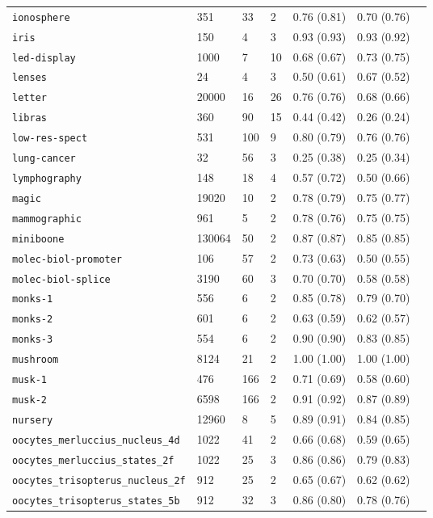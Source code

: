 \begin{tabular}{lllllll}
\verb!ionosphere! & 351 & 33 & 2 & 0.76 (0.81) & 0.70 (0.76)\\ 
\verb!iris! & 150 & 4 & 3 & 0.93 (0.93) & 0.93 (0.92)\\ 
\verb!led-display! & 1000 & 7 & 10 & 0.68 (0.67) & 0.73 (0.75)\\ 
\verb!lenses! & 24 & 4 & 3 & 0.50 (0.61) & 0.67 (0.52)\\ 
\verb!letter! & 20000 & 16 & 26 & 0.76 (0.76) & 0.68 (0.66)\\ 
\verb!libras! & 360 & 90 & 15 & 0.44 (0.42) & 0.26 (0.24)\\ 
\verb!low-res-spect! & 531 & 100 & 9 & 0.80 (0.79) & 0.76 (0.76)\\ 
\verb!lung-cancer! & 32 & 56 & 3 & 0.25 (0.38) & 0.25 (0.34)\\ 
\verb!lymphography! & 148 & 18 & 4 & 0.57 (0.72) & 0.50 (0.66)\\ 
\verb!magic! & 19020 & 10 & 2 & 0.78 (0.79) & 0.75 (0.77)\\ 
\verb!mammographic! & 961 & 5 & 2 & 0.78 (0.76) & 0.75 (0.75)\\ 
\verb!miniboone! & 130064 & 50 & 2 & 0.87 (0.87) & 0.85 (0.85)\\ 
\verb!molec-biol-promoter! & 106 & 57 & 2 & 0.73 (0.63) & 0.50 (0.55)\\ 
\verb!molec-biol-splice! & 3190 & 60 & 3 & 0.70 (0.70) & 0.58 (0.58)\\ 
\verb!monks-1! & 556 & 6 & 2 & 0.85 (0.78) & 0.79 (0.70)\\ 
\verb!monks-2! & 601 & 6 & 2 & 0.63 (0.59) & 0.62 (0.57)\\ 
\verb!monks-3! & 554 & 6 & 2 & 0.90 (0.90) & 0.83 (0.85)\\ 
\verb!mushroom! & 8124 & 21 & 2 & 1.00 (1.00) & 1.00 (1.00)\\ 
\verb!musk-1! & 476 & 166 & 2 & 0.71 (0.69) & 0.58 (0.60)\\ 
\verb!musk-2! & 6598 & 166 & 2 & 0.91 (0.92) & 0.87 (0.89)\\ 
\verb!nursery! & 12960 & 8 & 5 & 0.89 (0.91) & 0.84 (0.85)\\ 
\verb!oocytes_merluccius_nucleus_4d! & 1022 & 41 & 2 & 0.66 (0.68) & 0.59 (0.65)\\ 
\verb!oocytes_merluccius_states_2f! & 1022 & 25 & 3 & 0.86 (0.86) & 0.79 (0.83)\\ 
\verb!oocytes_trisopterus_nucleus_2f! & 912 & 25 & 2 & 0.65 (0.67) & 0.62 (0.62)\\ 
\verb!oocytes_trisopterus_states_5b! & 912 & 32 & 3 & 0.86 (0.80) & 0.78 (0.76)\\ 

\end{tabular}
